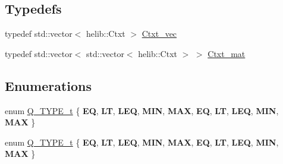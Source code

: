 \subsection*{Typedefs}
\begin{DoxyCompactItemize}
\item 
typedef std\+::vector$<$ helib\+::\+Ctxt $>$ \hyperlink{namespaceHDB__supergate___ade0781b5973aae08b689ed72b30511fb}{Ctxt\+\_\+vec}
\item 
typedef std\+::vector$<$ std\+::vector$<$ helib\+::\+Ctxt $>$ $>$ \hyperlink{namespaceHDB__supergate___a46a3fb2b98c95dc7615203376c4ad0c8}{Ctxt\+\_\+mat}
\end{DoxyCompactItemize}
\subsection*{Enumerations}
\begin{DoxyCompactItemize}
\item 
enum \hyperlink{namespaceHDB__supergate___a1d92aed09c83a1692f702cbaa85757e2}{Q\+\_\+\+T\+Y\+P\+E\+\_\+t} \{ \newline
{\bfseries EQ}, 
{\bfseries LT}, 
{\bfseries L\+EQ}, 
{\bfseries M\+IN}, 
\newline
{\bfseries M\+AX}, 
{\bfseries EQ}, 
{\bfseries LT}, 
{\bfseries L\+EQ}, 
\newline
{\bfseries M\+IN}, 
{\bfseries M\+AX}
 \}
\item 
enum \hyperlink{namespaceHDB__supergate___a1d92aed09c83a1692f702cbaa85757e2}{Q\+\_\+\+T\+Y\+P\+E\+\_\+t} \{ \newline
{\bfseries EQ}, 
{\bfseries LT}, 
{\bfseries L\+EQ}, 
{\bfseries M\+IN}, 
\newline
{\bfseries M\+AX}, 
{\bfseries EQ}, 
{\bfseries LT}, 
{\bfseries L\+EQ}, 
\newline
{\bfseries M\+IN}, 
{\bfseries M\+AX}
 \}
\end{DoxyCompactItemize}
